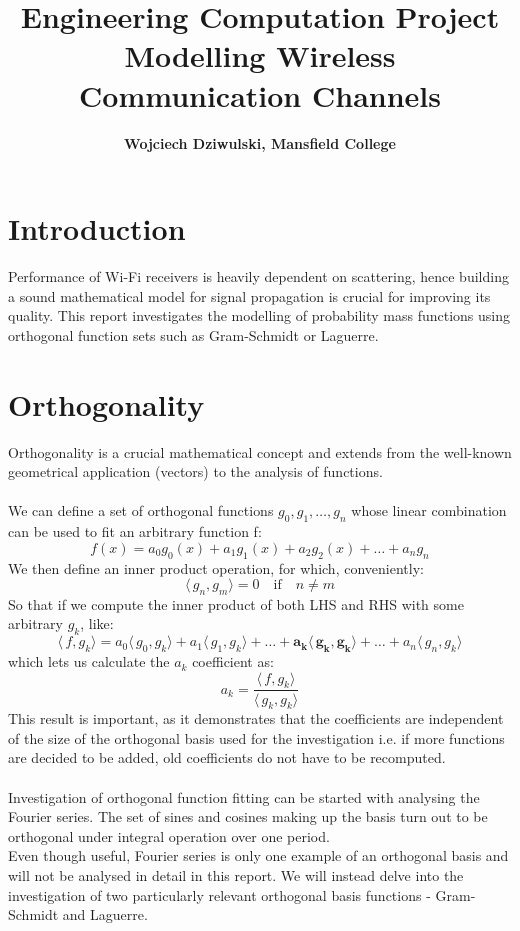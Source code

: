 \documentclass[a4paper]{article}
\title{Engineering Computation Project \\ \large Modelling Wireless Communication Channels}
\author{\textbf{Wojciech Dziwulski, Mansfield College}}
\date{}
\numberwithin{equation}{section}
\begin{document}
\maketitle

\section{Introduction}

Performance of Wi-Fi receivers is heavily dependent on scattering, hence building a sound mathematical model for signal propagation is crucial for improving its quality. This report investigates the modelling of probability mass functions using orthogonal function sets such as Gram-Schmidt or Laguerre.

\section{Orthogonality}

Orthogonality is a crucial mathematical concept and extends from the well-known geometrical application (vectors) to the analysis of functions.
\\ \\
We can define a set of orthogonal functions $g_0, g_1, \ldots, g_n$ whose linear combination can be used to fit an arbitrary function f:
\begin{equation}f(x) = a_0 g_0(x)+a_1 g_1(x)+a_2 g_2(x)+\ldots+a_n g_n \end{equation}
\noindent We then define an inner product operation, for which, conveniently:
\begin{equation} \langle\,g_n,g_m\rangle = 0 \quad \textrm{if} \quad n \ne m \end{equation}
So that if we compute the inner product of both LHS and RHS with some arbitrary $g_k$, like:
\begin{equation} \langle\,f,g_k\rangle = a_0\langle\,g_0,g_k\rangle + a_1\langle\,g_1,g_k\rangle + \ldots + \boldsymbol{a_k\langle\,g_k,g_k\rangle} + \ldots + a_n\langle\,g_n,g_k\rangle \end{equation}
which lets us calculate the $a_k$ coefficient as:
\begin{equation} a_k = \frac {\langle\,f,g_k\rangle} {\langle\,g_k,g_k\rangle} \end{equation}
This result is important, as it demonstrates that the coefficients are independent of the size of the orthogonal basis used for the investigation i.e. if more functions are decided to be added, old coefficients do not have to be recomputed.
\\ \\
Investigation of orthogonal function fitting can be started with analysing the Fourier series. The set of sines and cosines making up the basis turn out to be orthogonal under integral operation over one period.
\\
Even though useful, Fourier series is only one example of an orthogonal basis and will not be analysed in detail in this report. We will instead delve into the investigation of two particularly relevant orthogonal basis functions - Gram-Schmidt and Laguerre.
\end{document}
